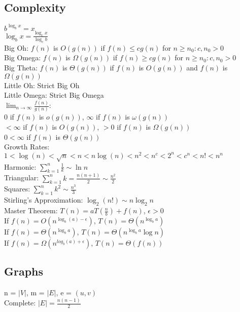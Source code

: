 \documentclass{article}
\begin{document}
\begin{multicols*}{2}
        \subsection*{Complexity}
        $b^{\log_b x} = x$\\
        $\log_b x = \frac{\log_c x}{\log_c b}$\\
        Big Oh: $f(n)$ is $O(g(n))$ if $f(n) \leq cg(n)$ for $n \geq n_0 : c, n_0 > 0$\\
        Big Omega: $f(n)$ is $\Omega(g(n))$ if $f(n) \geq cg(n)$ for $n \geq n_0 : c, n_0 > 0$\\
        Big Theta: $f(n)$ is $\Theta(g(n))$ if $f(n)$ is $O(g(n))$ and $f(n)$ is $\Omega(g(n))$\\
        Little Oh: Strict Big Oh\\
        Little Omega: Strict Big Omega\\
        $\lim_{n\to\infty}\frac{f(n)}{g(n)}$:\\
        0 if $f(n)$ is $o(g(n))$, $\infty$ if $f(n)$ is $\omega(g(n))$\\
        $< \infty$ if $f(n)$ is $O(g(n))$, $> 0$ if $f(n)$ is $\Omega(g(n))$\\
        $0 < \infty$ if $f(n)$ is $\Theta(g(n))$\\
        Growth Rates: $1 < \log(n) < \sqrt{n} < n < n\log(n) < n^2 < n^c < 2^n < c^n < n! < n^n$\\
        Harmonic: $\sum_{k=1}^{n} \frac{1}{k} \sim \ln n$\\
        Triangular: $\sum_{k=1}^{n} k = \frac{n(n + 1)}{2} \sim \frac{n^2}{2}$\\
        Squares: $\sum_{k=1}^{n} k^2 \sim \frac{n^3}{3}$\\
        Stirling's Approximation: $\log_2(n!) \sim n\log_2 n$\\
        Master Theorem: $T(n) = aT(\frac{n}{b}) + f(n)$, $\epsilon > 0$\\
        If $f(n) = O(n^{\log_b (a) - \epsilon})$, $T(n) = \Theta(n^{\log_b a})$\\
        If $f(n) = \Theta(n^{\log_b a})$, $T(n) = \Theta(n^{\log_b a}\log n)$\\
        If $f(n) = \Omega(n^{log_b (a) + \epsilon})$, $T(n) = \Theta(f(n))$
        \subsection*{Graphs}
        n = $\rvert V \lvert$, m = $\rvert E \lvert$, e = $(u, v)$\\
        Complete: $\lvert E \rvert = \frac{n(n - 1)}{2}$

\end{multicols*}
\end{document}

